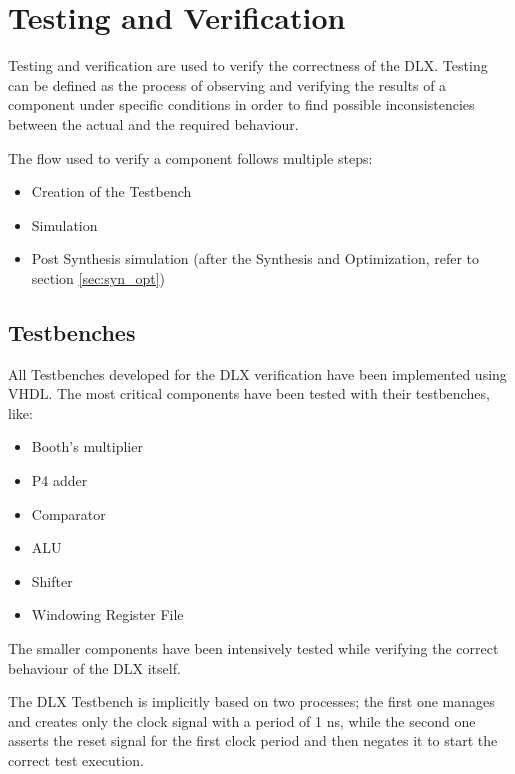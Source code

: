 \chapter{Testing and Verification}
Testing and verification are used to verify the correctness of the DLX. Testing can be defined as the process of observing and verifying the results of a component under specific conditions in order to find possible inconsistencies between the actual and the required behaviour.

The flow used to verify a component follows multiple steps:
\begin{itemize}
    \itemsep0sp
    \item Creation of the Testbench
    \item Simulation
    \item Post Synthesis simulation (after the Synthesis and Optimization, refer to section \ref{sec:syn_opt})
\end{itemize}

\section{Testbenches}
All Testbenches developed for the DLX verification have been implemented using VHDL. The most critical components have been tested with their testbenches, like:
\begin{itemize}
    \itemsep0sp
    \item Booth's multiplier
    \item P4 adder
    \item Comparator
    \item ALU
    \item Shifter
    \item Windowing Register File
\end{itemize}
The smaller components have been intensively tested while verifying the correct behaviour of the DLX itself.\newline\newline

The DLX Testbench is implicitly based on two processes; the first one manages and creates only the clock signal with a period of 1 ns, while the second one asserts the reset signal for the first clock period and then negates it to start the correct test execution.

